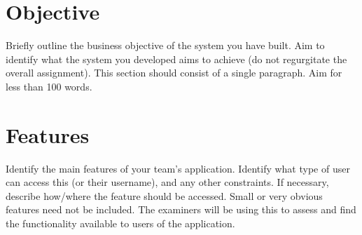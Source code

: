 \documentclass[11pt,a4paper]{article}
\begin{document}
\section*{Objective}
Briefly outline the business objective of the system you have built.  Aim to identify what the system you developed aims to achieve (do not regurgitate the overall assignment).  This section should consist of a single paragraph.  Aim for less than 100 words.


\section*{Features}
Identify the main features of your team's application.  Identify what type of user can access this (or their username), and any other constraints.  If necessary, describe how/where the feature should be accessed.  Small or very obvious features need not be included.  The examiners will be using this to assess and find the functionality available to users of the application.  
\end{document}
